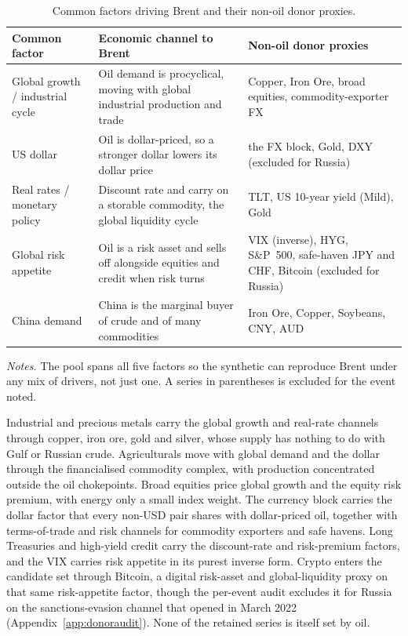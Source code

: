 \begin{table}[h]
\centering
\caption{Common factors driving Brent and their non-oil donor proxies.}
\label{tab:factors}
\begin{threeparttable}
\small
\begin{tabular}{@{}p{3.1cm}p{5.3cm}p{5.3cm}@{}}
\toprule
Common factor & Economic channel to Brent & Non-oil donor proxies \\
\midrule
Global growth / industrial cycle & Oil demand is procyclical, moving with global industrial production and trade & Copper, Iron Ore, broad equities, commodity-exporter FX \\
US dollar & Oil is dollar-priced, so a stronger dollar lowers its dollar price & the FX block, Gold, DXY (excluded for Russia) \\
Real rates / monetary policy & Discount rate and carry on a storable commodity, the global liquidity cycle & TLT, US 10-year yield (Mild), Gold \\
Global risk appetite & Oil is a risk asset and sells off alongside equities and credit when risk turns & VIX (inverse), HYG, S\&P~500, safe-haven JPY and CHF, Bitcoin (excluded for Russia) \\
China demand & China is the marginal buyer of crude and of many commodities & Iron Ore, Copper, Soybeans, CNY, AUD \\
\bottomrule
\end{tabular}
\begin{tablenotes}[flushleft]
\footnotesize
\item \textit{Notes.} The pool spans all five factors so the synthetic can reproduce Brent under any mix of drivers, not just one. A series in parentheses is excluded for the event noted. 
\end{tablenotes}
\end{threeparttable}
\end{table}

Industrial and precious metals carry the global growth
and real-rate channels through copper, iron ore, gold and silver, whose supply has nothing
to do with Gulf or Russian crude. Agriculturals move with global demand and the dollar
through the financialised commodity complex, with production concentrated outside the oil
chokepoints. Broad equities price global growth and the equity risk premium, with energy
only a small index weight. The currency block carries the dollar factor that every non-USD
pair shares with dollar-priced oil, together with terms-of-trade and risk channels for
commodity exporters and safe havens. Long Treasuries and high-yield credit carry the
discount-rate and risk-premium factors, and the VIX carries risk appetite in its purest
inverse form. Crypto enters the candidate set through Bitcoin, a digital risk-asset and
global-liquidity proxy on that same risk-appetite factor, though the per-event audit excludes
it for Russia on the sanctions-evasion channel that opened in March 2022
(Appendix~\ref{app:donoraudit}). None of the retained series is itself set by oil.

